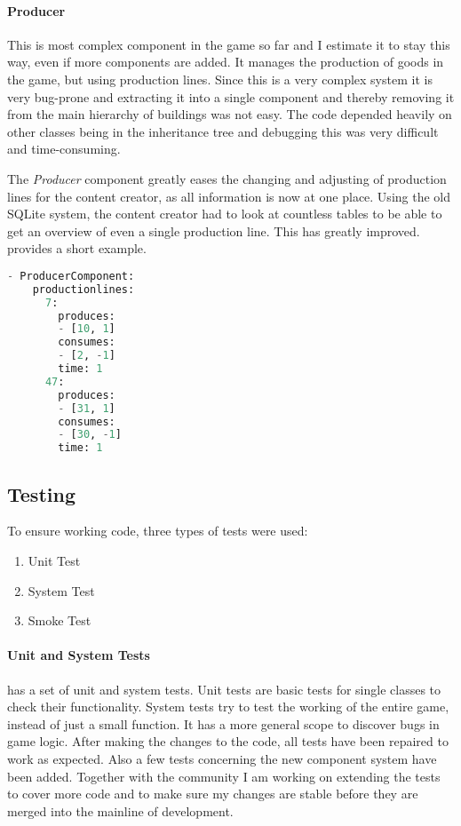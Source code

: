 \paragraph{Producer}
This is most complex component in the game so far and I estimate it to stay this way, even if more components are added.
It manages the production of goods in the game, but using production lines. Since this is a very complex system it is
very bug-prone and extracting it into a single component and thereby removing it from the main hierarchy of buildings
was not easy. The code depended heavily on other classes being in the inheritance tree and debugging this was very
difficult and time-consuming.

The \textit{Producer} component greatly eases the changing and adjusting of production lines for the content creator, as
all information is now at one place. Using the old SQLite system, the content creator had to look at countless tables to
be able to get an overview of even a single production line. This has greatly improved.  provides a short
example.

\begin{lstlisting}[language=python,caption=YAML representation of the Producer with two production lines,
label=produceryaml]
- ProducerComponent:
    productionlines:
      7:
        produces:
        - [10, 1]
        consumes:
        - [2, -1]
        time: 1
      47:
        produces:
        - [31, 1]
        consumes:
        - [30, -1]
        time: 1
\end{lstlisting}

\subsection{Testing}
To ensure working code, three types of tests were used:
\begin{enumerate}
    \item Unit Test
    \item System Test
    \item Smoke Test
\end{enumerate}

\paragraph{Unit and System Tests}
\UH{} has a set of unit and system tests. Unit tests are basic tests for single classes to check their functionality.
System tests try to test the working of the entire game, instead of just a small function. It has a more general scope
to discover bugs in game logic.
After making the changes to the code, all tests have been repaired to work as expected. Also a few tests concerning the
new component system have been added. Together with the community I am working on extending the tests to cover more code
and to make sure my changes are stable before they are merged into the mainline of development.

